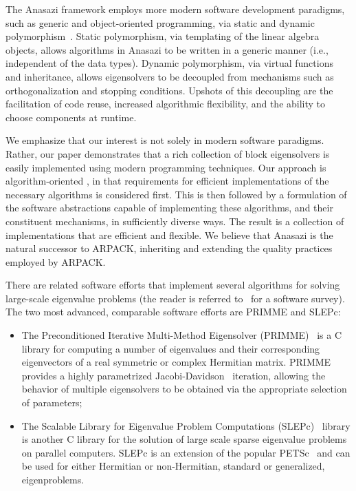 \documentclass[acmtoms]{acmtrans2m}
\newcounter{algorithm}
\begin{document}
The Anasazi framework employs more modern software development paradigms, such as generic and
object-oriented programming, via static and dynamic polymorphism~\cite[Chapter 14]{VJ02}. Static
polymorphism, via templating of the linear algebra objects, allows algorithms in Anasazi
to be written in a generic manner (i.e., independent of the data types). Dynamic
polymorphism, via virtual functions and inheritance, allows eigensolvers to be decoupled
from mechanisms such as orthogonalization and stopping conditions. Upshots of this
decoupling are the facilitation of code reuse, increased algorithmic flexibility, and the
ability to choose components at runtime.

We emphasize that our interest is not solely in modern software paradigms. Rather, our
paper demonstrates that a rich collection of block eigensolvers is easily implemented
using modern programming techniques. Our approach is algorithm-oriented \cite{muov:94}, in
that requirements for efficient implementations of the necessary algorithms is considered
first. This is then followed by a formulation of the software abstractions capable of
implementing these algorithms, and their constituent mechanisms, in sufficiently diverse
ways. The result is a collection of implementations that are efficient and flexible. We
believe that Anasazi is the natural successor to ARPACK, inheriting and extending the
quality practices employed by ARPACK.

There are related software efforts that implement several algorithms for solving
large-scale eigenvalue problems (the reader is referred to~\cite{slepc:05}
for a software survey).  The two most advanced, comparable software efforts are PRIMME and
SLEPc:
\begin{itemize}
\item
The Preconditioned Iterative Multi-Method Eigensolver (PRIMME)~\cite{primme:06} is a C
library for computing a number of eigenvalues and their corresponding eigenvectors of a real
symmetric or complex Hermitian matrix. PRIMME provides a highly parametrized
Jacobi-Davidson~\cite{slvo:96} iteration, allowing the behavior of multiple eigensolvers
to be obtained via the appropriate selection of parameters;
\item
The Scalable Library for Eigenvalue Problem Computations (SLEPc)~\cite{slepc:06} library
is another C library for the solution of large scale sparse eigenvalue problems on parallel
computers. SLEPc is an extension of the popular PETSc~\cite{petsc-web-page} and can be
used for either Hermitian or non-Hermitian, standard or generalized, eigenproblems.
\end{itemize}
\end{document}
